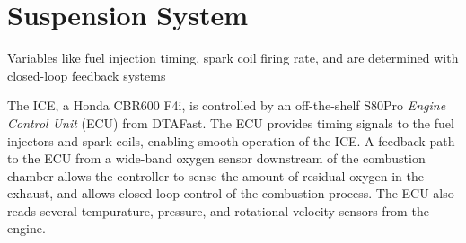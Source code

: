 \section{Suspension System}

Variables like fuel injection timing, spark coil firing rate, and  are determined with closed-loop
feedback systems 

The ICE, a Honda CBR600 F4i, is controlled by an off-the-shelf S80Pro \emph{Engine Control Unit} 
(ECU) from DTAFast\cite{s60pro}. The ECU provides
timing signals to the fuel injectors and spark coils, enabling smooth operation of the ICE. 
A feedback path to the ECU from a wide-band oxygen sensor downstream of the combustion chamber 
allows the controller to sense the amount of residual oxygen in the exhaust, and allows closed-loop 
control of the combustion process. The ECU also reads several tempurature, pressure, and rotational 
velocity sensors from the engine.
